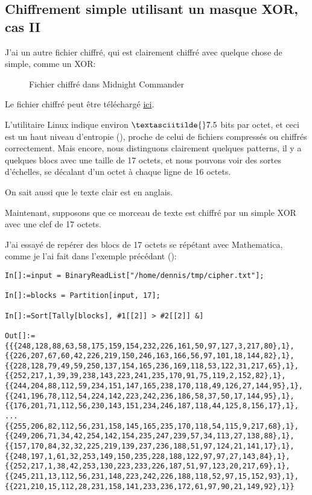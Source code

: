 \subsection{Chiffrement simple utilisant un masque XOR, cas II}
\label{XOR_mask_2}

J'ai un autre fichier chiffré, qui est clairement chiffré avec quelque chose de simple,
comme un XOR:

\begin{figure}[H]
\centering
{}
\caption{Fichier chiffré dans Midnight Commander}
\end{figure}

Le fichier chiffré peut être téléchargé
\href{https://github.com/DennisYurichev/RE-for-beginners/blob/master/ff/XOR/mask_2/files/cipher.txt}{ici}.

L'utilitaire Linux  indique environ $\textasciitilde{}7.5$ bits par octet,
et ceci est un haut niveau d'entropie (), proche de celui de fichiers
compressés ou chiffrés correctement.
Mais encore, nous distinguons clairement quelques patterns, il y a quelques blocs
avec une taille de 17 octets, et nous pouvons voir des sortes d'échelles, se décalant
d'un octet à chaque ligne de 16 octets.

On sait aussi que le texte clair est en anglais.

Maintenant, supposons que ce morceau de texte est chiffré par un simple XOR avec une
clef de 17 octets.

J'ai essayé de repérer des blocs de 17 octets se répétant avec Mathematica, comme
je l'ai fait dans l'exemple précédant ():

\begin{lstlisting}[caption=Mathematica,style=custommath]
In[]:=input = BinaryReadList["/home/dennis/tmp/cipher.txt"];

In[]:=blocks = Partition[input, 17];

In[]:=Sort[Tally[blocks], #1[[2]] > #2[[2]] &]

Out[]:={{{248,128,88,63,58,175,159,154,232,226,161,50,97,127,3,217,80},1},
{{226,207,67,60,42,226,219,150,246,163,166,56,97,101,18,144,82},1},
{{228,128,79,49,59,250,137,154,165,236,169,118,53,122,31,217,65},1},
{{252,217,1,39,39,238,143,223,241,235,170,91,75,119,2,152,82},1},
{{244,204,88,112,59,234,151,147,165,238,170,118,49,126,27,144,95},1},
{{241,196,78,112,54,224,142,223,242,236,186,58,37,50,17,144,95},1},
{{176,201,71,112,56,230,143,151,234,246,187,118,44,125,8,156,17},1},
...
{{255,206,82,112,56,231,158,145,165,235,170,118,54,115,9,217,68},1},
{{249,206,71,34,42,254,142,154,235,247,239,57,34,113,27,138,88},1},
{{157,170,84,32,32,225,219,139,237,236,188,51,97,124,21,141,17},1},
{{248,197,1,61,32,253,149,150,235,228,188,122,97,97,27,143,84},1},
{{252,217,1,38,42,253,130,223,233,226,187,51,97,123,20,217,69},1},
{{245,211,13,112,56,231,148,223,242,226,188,118,52,97,15,152,93},1},
{{221,210,15,112,28,231,158,141,233,236,172,61,97,90,21,149,92},1}}
\end{lstlisting}

